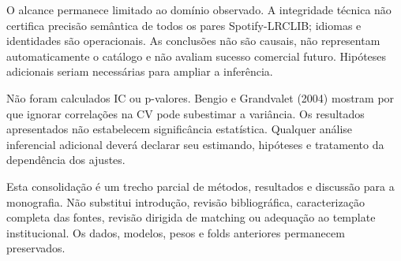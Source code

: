 O alcance permanece limitado ao domínio observado. A integridade técnica não certifica precisão semântica de todos os pares Spotify-LRCLIB; idiomas e identidades são operacionais. As conclusões não são causais, não representam automaticamente o catálogo e não avaliam sucesso comercial futuro. Hipóteses adicionais seriam necessárias para ampliar a inferência.


Não foram calculados IC ou p-valores. Bengio e Grandvalet (2004) mostram por que ignorar correlações na CV pode subestimar a variância. Os resultados apresentados não estabelecem significância estatística. Qualquer análise inferencial adicional deverá declarar seu estimando, hipóteses e tratamento da dependência dos ajustes.




Esta consolidação é um trecho parcial de métodos, resultados e discussão para a monografia. Não substitui introdução, revisão bibliográfica, caracterização completa das fontes, revisão dirigida de matching ou adequação ao template institucional. Os dados, modelos, pesos e folds anteriores permanecem preservados.


\FloatBarrier
